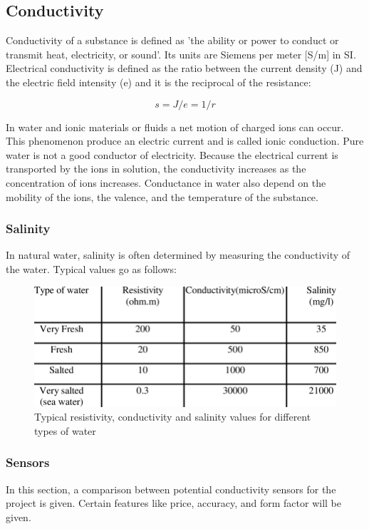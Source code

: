 \newpage
\subsection{Conductivity}
Conductivity of a substance is defined as 'the ability or power to conduct or transmit heat, electricity, or sound'. \cite{merriamconductivity} Its units are Siemens per meter [S/m] in SI. Electrical conductivity is defined as the ratio between the current density (J) and the electric field intensity (e) and it is the reciprocal of the resistance:

\[s = J/e = 1/r\]

In water and ionic materials or fluids a net motion of charged ions can occur. This phenomenon produce an electric current and is called ionic conduction. Pure water is not a good conductor of electricity. Because the electrical current is transported by the ions in solution, the conductivity increases as the concentration of ions increases. \cite{lenntech} Conductance in water also depend on the mobility of the ions, the valence, and the temperature of the substance. \cite{standardmethods}\\


\subsubsection{Salinity}
In natural water, salinity is often determined by measuring the conductivity of the water. Typical values go as follows:

\begin{figure}[h]
\centering
\includegraphics[scale=0.4]{water/61_typicalvalues.png}
\caption{Typical resistivity, conductivity and salinity values for different types of water \cite{abdulsamsudin}}
\end{figure}

\newpage
\subsubsection{Sensors}
In this section, a comparison between potential conductivity sensors for the project is given. Certain features like price, accuracy, and form factor will be given.

